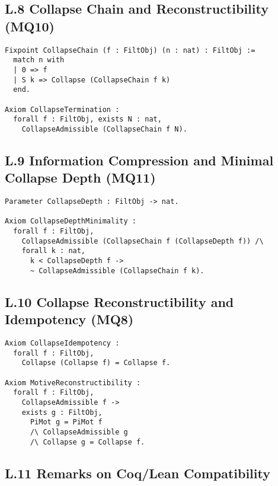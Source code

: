 \documentclass[11pt]{article}
\begin{document}
\subsection*{L.8 Collapse Chain and Reconstructibility (MQ10)}

\begin{lstlisting}[language=Coq, caption=Recursive Collapse Chain and Reconstructibility]
Fixpoint CollapseChain (f : FiltObj) (n : nat) : FiltObj :=
  match n with
  | 0 => f
  | S k => Collapse (CollapseChain f k)
  end.

Axiom CollapseTermination :
  forall f : FiltObj, exists N : nat,
    CollapseAdmissible (CollapseChain f N).
\end{lstlisting}

\subsection*{L.9 Information Compression and Minimal Collapse Depth (MQ11)}

\begin{lstlisting}[language=Coq, caption=Collapse Depth and Informational Minimality]
Parameter CollapseDepth : FiltObj -> nat.

Axiom CollapseDepthMinimality :
  forall f : FiltObj,
    CollapseAdmissible (CollapseChain f (CollapseDepth f)) /\
    forall k : nat,
      k < CollapseDepth f ->
      ~ CollapseAdmissible (CollapseChain f k).
\end{lstlisting}

\subsection*{L.10 Collapse Reconstructibility and Idempotency (MQ8)}

\begin{lstlisting}[language=Coq, caption=Collapse Idempotency and Reconstruction]
Axiom CollapseIdempotency :
  forall f : FiltObj,
    Collapse (Collapse f) = Collapse f.

Axiom MotiveReconstructibility :
  forall f : FiltObj,
    CollapseAdmissible f ->
    exists g : FiltObj,
      PiMot g = PiMot f
      /\ CollapseAdmissible g
      /\ Collapse g = Collapse f.
\end{lstlisting}

\subsection*{L.11 Remarks on Coq/Lean Compatibility}
\end{document}
